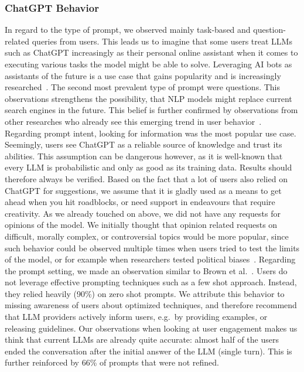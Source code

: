 \subsubsection{ChatGPT Behavior}
In regard to the type of prompt, we observed mainly task-based and question-related queries from
users.
This leads us to imagine that some users treat LLMs such as ChatGPT increasingly as their
personal online assistant when it comes to executing various tasks the model might be able to solve.
Leveraging AI bots as assistants of the future is a use case that gains popularity and is
increasingly researched~\cite{eshghie_chatgpt_2023}.
The second most prevalent type of prompt were questions.
This observations strengthens the possibility, that NLP models might replace current search engines
in the future.
This belief is further confirmed by observations from other researches who already see this
emerging trend in user behavior~\cite{van_bulck_what_2023}.
Regarding prompt intent, looking for information was the most popular use case.
Seemingly, users see ChatGPT as a reliable source of knowledge and trust its abilities.
This assumption can be dangerous however, as it is well-known that every LLM is probabilistic and
only as good as its training data.
Results should therefore always be verified.
Based on the fact that a lot of users also relied on ChatGPT for suggestions, we assume that it
is gladly used as a means to get ahead when you hit roadblocks, or need support in endeavours
that require creativity.
As we already touched on above, we did not have any requests for opinions of the model.
We initially thought that opinion related requests on difficult, morally complex, or
controversial topics would be more popular, since such behavior could be observed multiple times
when users tried to test the limits of the model, or for example when researchers tested political
biases~\cite{rozado_political_2023}.
Regarding the prompt setting, we made an observation similar to Brown et al.~\cite{
    brown_language_2020}.
Users do not leverage effective prompting techniques such as a few shot approach.
Instead, they relied heavily (90\%) on zero shot prompts.
We attribute this behavior to missing awareness of users about optimized techniques, and
therefore recommend that LLM providers actively inform users, e.g.\ by
providing examples, or releasing guidelines.
Our observations when looking at user engagement makes us think that current LLMs are already
quite accurate: almost half of the users ended the conversation after the initial answer of
the LLM (single turn).
This is further reinforced by 66\% of prompts that were not refined.

